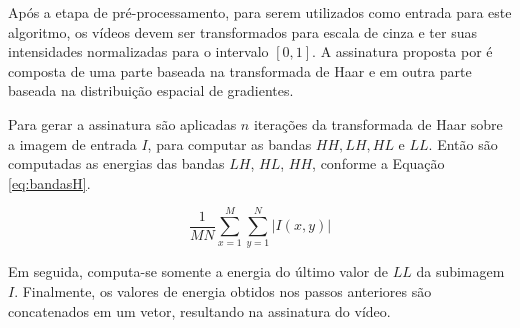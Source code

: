 Após a etapa de pré-processamento, para serem utilizados como entrada para este algoritmo, os vídeos devem ser transformados para escala de cinza e ter suas intensidades normalizadas para o intervalo $[0,1]$. A assinatura proposta por  é composta de uma parte baseada na transformada de Haar e em outra parte baseada na distribuição espacial de gradientes.

 Para gerar a assinatura são aplicadas $n$ iterações da transformada de Haar sobre a imagem de entrada $I$, para computar as bandas $HH, LH, HL$ e $LL$.  Então são computadas as energias das bandas $LH$, $HL$, $HH$, conforme a Equação \ref{eq:bandasH}.
 
 \begin{equation}
	\label{eq:bandasH}
	\frac{1}{MN}\sum_{x=1}^M \sum_{y=1}^N |I(x,y)|
\end{equation} 
 
 
 

 Em seguida, computa-se somente a energia do último valor de $LL$ da subimagem $I$. Finalmente, os valores de energia obtidos nos passos anteriores são concatenados em um vetor, resultando na assinatura do vídeo.




